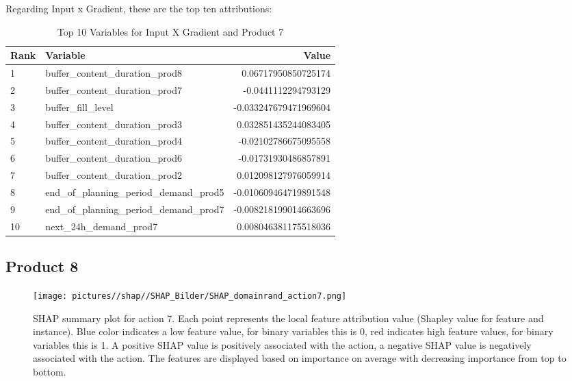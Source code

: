 Regarding Input x Gradient, these are the top ten attributions:

\begin{table}[ht!]
    \footnotesize
    \centering
    \caption{Top 10 Variables for Input X Gradient and Product 7}
    \label{tab:top_variables_target6}
    \begin{tabularx}{\textwidth}{lXr}
        \toprule
        \textbf{Rank} & \textbf{Variable}                        & \textbf{Value}        \\
        \midrule
        1             & buffer\_content\_duration\_prod8         & 0.06717950850725174   \\
        2             & buffer\_content\_duration\_prod7         & -0.0441112294793129   \\
        3             & buffer\_fill\_level                      & -0.033247679471969604 \\
        4             & buffer\_content\_duration\_prod3         & 0.032851435244083405  \\
        5             & buffer\_content\_duration\_prod4         & -0.02102786675095558  \\
        6             & buffer\_content\_duration\_prod6         & -0.01731930486857891  \\
        7             & buffer\_content\_duration\_prod2         & 0.012098127976059914  \\
        8             & end\_of\_planning\_period\_demand\_prod5 & -0.010609464719891548 \\
        9             & end\_of\_planning\_period\_demand\_prod7 & -0.008218199014663696 \\
        10            & next\_24h\_demand\_prod7                 & 0.008046381175518036  \\
        \bottomrule
    \end{tabularx}
\end{table}
\FloatBarrier


\subsection{Product 8}

\begin{figure}[H]
    \centering
    \texttt{[image: pictures//shap//SHAP\_Bilder/SHAP\_domainrand\_action7.png]}
    \caption{SHAP summary plot for action 7.
        Each point represents the local feature attribution value (Shapley value for feature and instance).
        Blue color indicates a low feature value, for binary variables this is 0, red indicates high feature values, for binary variables this is 1. A positive SHAP value is positively associated with the action, a negative SHAP value is negatively associated with the action. The features are displayed based on importance on average with decreasing importance from top to bottom.}
    \label{fig:SHAP_Action7}
\end{figure}

